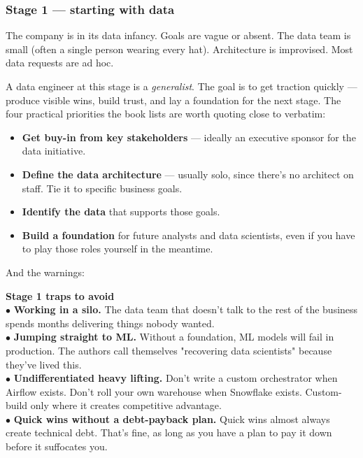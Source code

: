 \subsubsection{Stage 1 — starting with data}

The company is in its data infancy. Goals are vague or absent. The data team is small (often a single person wearing every hat). Architecture is improvised. Most data requests are ad hoc.

A data engineer at this stage is a \emph{generalist}. The goal is to get traction quickly — produce visible wins, build trust, and lay a foundation for the next stage. The four practical priorities the book lists are worth quoting close to verbatim:

\begin{itemize}[leftmargin=*]
  \item \textbf{Get buy-in from key stakeholders} — ideally an executive sponsor for the data initiative.
  \item \textbf{Define the data architecture} — usually solo, since there's no architect on staff. Tie it to specific business goals.
  \item \textbf{Identify the data} that supports those goals.
  \item \textbf{Build a foundation} for future analysts and data scientists, even if you have to play those roles yourself in the meantime.
\end{itemize}

And the warnings:

\begin{warnbox}
\textbf{Stage 1 traps to avoid}\\
$\bullet$ \textbf{Working in a silo.} The data team that doesn't talk to the rest of the business spends months delivering things nobody wanted.\\
$\bullet$ \textbf{Jumping straight to ML.} Without a foundation, ML models will fail in production. The authors call themselves "recovering data scientists" because they've lived this.\\
$\bullet$ \textbf{Undifferentiated heavy lifting.} Don't write a custom orchestrator when Airflow exists. Don't roll your own warehouse when Snowflake exists. Custom-build only where it creates competitive advantage.\\
$\bullet$ \textbf{Quick wins without a debt-payback plan.} Quick wins almost always create technical debt. That's fine, as long as you have a plan to pay it down before it suffocates you.
\end{warnbox}

